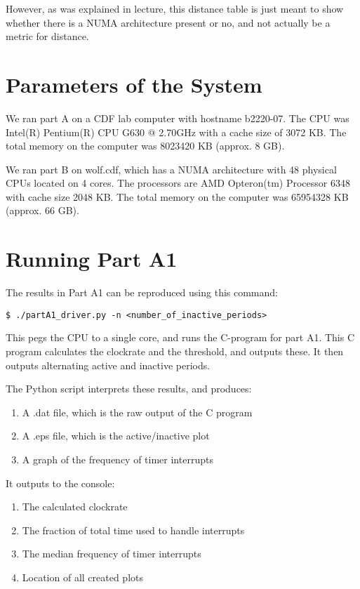 \documentclass[a4paper, 12pt]{article}
\begin{document}
However, as was explained in lecture, this distance table is just meant to show whether there is a NUMA architecture present or no, and not actually be a metric for distance.

\begin{appendices}
\section{Parameters of the System}

We ran part A on a CDF lab computer with hostname b2220-07. The CPU was Intel(R) Pentium(R) CPU G630 @ 2.70GHz with a cache size of 3072 KB. The total memory on the computer was 8023420 KB (approx. 8 GB).

We ran part B on wolf.cdf, which has a NUMA architecture with 48 physical CPUs located on 4 cores. The processors are AMD Opteron(tm) Processor 6348 with cache size 2048 KB. The total memory on the computer was 65954328 KB (approx. 66 GB).

\section{Running Part A1}

The results in Part A1 can be reproduced using this command:

\begin{lstlisting}
$ ./partA1_driver.py -n <number_of_inactive_periods>
\end{lstlisting}

This pegs the CPU to a single core, and runs the C-program for part A1. This C program calculates the clockrate and the threshold, and outputs these. It then outputs alternating active and inactive periods.

The Python script interprets these results, and produces:

\begin{enumerate}
\item	A .dat file, which is the raw output of the C program
\item	A .eps file, which is the active/inactive plot
\item	A graph of the frequency of timer interrupts
\end{enumerate}

It outputs to the console:

\begin{enumerate}
\item	The calculated clockrate
\item	The fraction of total time used to handle interrupts
\item	The median frequency of timer interrupts
\item	Location of all created plots
\end{enumerate}


\end{appendices}
\end{document}
